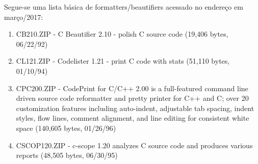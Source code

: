 \begin{englishtext}
\begin{bluebox}
\begin{enumerate}[leftmargin=*,parsep=0pt]
    \end{enumerate}
    \end{bluebox}

    Segue-se uma lista básica de formatters/beautifiers acessado no endereço
     em março/2017:

    \medskip
    \begin{sloppypar}
    \begin{bluebox}\RaggedRight
    \begin{enumerate}[leftmargin=*,parsep=0pt]

        \item CB210.ZIP - C Beautifier 2.10 - polish C source code (19,406 bytes, 06/22/92)
        \item CL121.ZIP - Codelister 1.21 - print C code with stats (51,110 bytes, 01/10/94)

        \item CPC200.ZIP - CodePrint for C/C++ 2.00 is a full-featured command line driven source
        code reformatter and pretty printer for C++ and C; over 20 customization features including
        auto-indent, adjustable tab spacing, indent styles, flow lines, comment alignment, and line
        editing for consistent white space (140,605 bytes, 01/26/96)

        \item CSCOP120.ZIP - c-scope 1.20 analyzes C source code and produces various reports
        (48,505 bytes, 06/30/95)


\end{enumerate}
\end{bluebox}
\end{sloppypar}
\end{englishtext}
